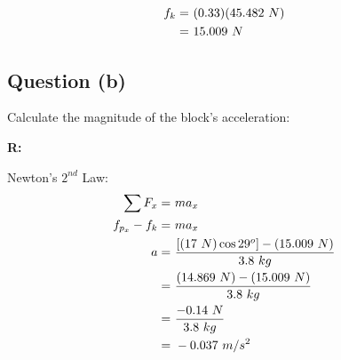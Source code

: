 		\begin{align}
			f_{k} = \ &(0.33)(45.482 \ N)& \notag \\
			= \ &15.009 \ N&
		\end{align}

	\subsection{Question (b)}

		Calculate the magnitude of the block's acceleration:

		\textbf{R:} \newline

		Newton's $2^{nd}$ Law:
		\begin{align}
			\sum F_{x} = \ &ma_{x}& \notag \\
			f_{p_{x}} - f_{k} = \ &ma_{x}& \notag \\
			a = \ &\frac{\left[(17 \ N) \cos 29^{o}\right]  - (15.009 \ N)}{3.8 \ kg}& \notag \\
			= \ &\frac{(14.869 \ N)  - (15.009 \ N)}{3.8 \ kg}& \notag \\
			= \ &\frac{-0.14 \ N}{3.8 \ kg}& \notag \\
			= \ &-0.037 \ m/s^{2}&
		\end{align}
